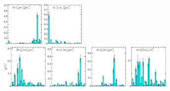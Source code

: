 \begin{figure}[H]
    \includegraphics[width=0.18\textwidth]{figures/sigmas/hu/zfactors/zfactor_isotriplet_kbar_nucleon-Hu_1-P010-A2-SS_0-P0-10-G1-SS_0.pdf}
    \includegraphics[width=0.18\textwidth]{figures/sigmas/hu/zfactors/zfactor_isotriplet_kbar_nucleon-Hu_1-P010-A2-SS_1-P0-10-G1-SS_0.pdf}\\
    \includegraphics[width=0.1975\textwidth]{figures/sigmas/hu/zfactors/zfactor_isotriplet_kbar_nucleon-Hu_1-P011-A2-SS_0-P0-1-1-G-SS_0.pdf}
    \includegraphics[width=0.18\textwidth]{figures/sigmas/hu/zfactors/zfactor_isotriplet_kbar_nucleon-Hu_1-P011-A2-SS_1-P0-1-1-G-SS_0.pdf}
    \includegraphics[width=0.18\textwidth]{figures/sigmas/hu/zfactors/zfactor_isotriplet_kbar_nucleon-Hu_1-P111-A2-SS_0-P-1-1-1-G-SS_0.pdf}
    \includegraphics[width=0.18\textwidth]{figures/sigmas/hu/zfactors/zfactor_isotriplet_pion_lambda-Hu_1-CG_1-P011-A2m-SS_0-P0-1-1-G-SS_0.pdf}

\end{figure}
